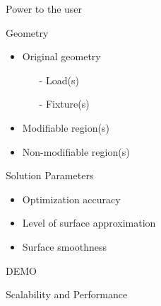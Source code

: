 \begin{frame} {Power to the user}
	
	\begin{block} {Geometry} {
			\begin{itemize}
				\item Original geometry
				\begin{itemize}
					\item[-] Load(s)
					\item[-] Fixture(s)
				\end{itemize}
				\item Modifiable region(s)
				\item Non-modifiable region(s)
			\end{itemize}
			}
	\end{block}
	\pause
	
	\begin{block} {Solution Parameters} {
			\begin{itemize}
				\item Optimization accuracy
				\item Level of surface approximation
				\item Surface smoothness
			\end{itemize}
			}
	\end{block}
		
\end{frame}

\begin{frame}{DEMO}

\end{frame}

\begin{frame}{Scalability and Performance}

\end{frame}
		